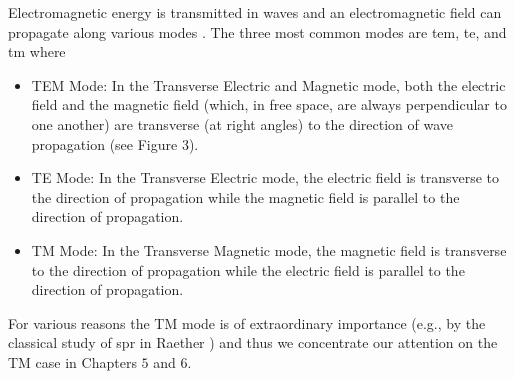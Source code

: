 Electromagnetic energy is transmitted in waves 
and an electromagnetic field can propagate along various modes \cite{snyder2012optical,okamoto2021fundamentals,Jackson75}. The three most common modes are \gls{tem}, \gls{te}, and \gls{tm} where
\begin{itemize}
\item TEM Mode: In the Transverse Electric and Magnetic mode, both the electric field and the magnetic field (which, in free space, are always perpendicular to one another) are transverse (at right angles) to the direction of wave propagation (see Figure 3).
\item TE Mode: In the Transverse Electric mode, the electric field is transverse to the direction of propagation while the magnetic field is parallel to the direction of propagation.
\item TM Mode: In the Transverse Magnetic mode, the magnetic field is transverse to the direction of propagation while the electric field is parallel to the direction of propagation.
\end{itemize}
For various reasons the TM mode is of extraordinary importance (e.g., by the classical study of \gls{spr} in Raether \cite{Raether88}) and thus we concentrate our attention on the TM case in Chapters $5$ and $6.$

